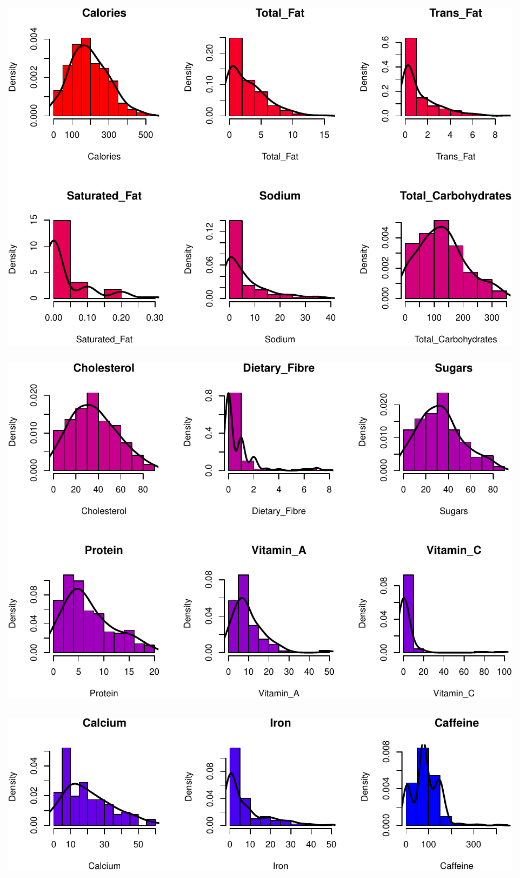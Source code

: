 \documentclass[
]{article}
\begin{document}
\begin{center}\includegraphics{Statistical_Learning_Final_Report_files/figure-latex/histograms-1} \end{center}

\begin{center}\includegraphics{Statistical_Learning_Final_Report_files/figure-latex/histograms-2} \end{center}

\begin{center}\includegraphics{Statistical_Learning_Final_Report_files/figure-latex/histograms-3} \end{center}
\end{document}
